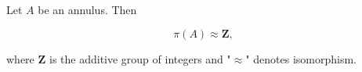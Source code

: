 Let $A$ be an annulus. Then

$$\pi(A) \approx \mathbf{Z},$$

where $\mathbf{Z}$ is the additive group of integers and "$\approx$" denotes isomorphism.
